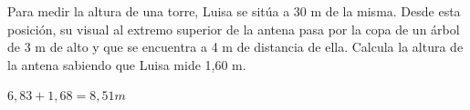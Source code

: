 \documentclass[addpoints,spanish, 12pt,a4paper]{exam}
\begin{document}
\begin{questions}








\question[2] Para medir la altura de una torre, Luisa se sitúa a 30 m de la misma. Desde esta posición, su visual al extremo superior de la antena pasa por la copa de un árbol de 3 m de alto y que se encuentra a 4 m de distancia de ella. Calcula la altura de la antena sabiendo que Luisa mide 1,60 m.
\begin{solution}
    $6,83 + 1,68 = 8,51 m$
\end{solution}





\end{questions}
\end{document}
